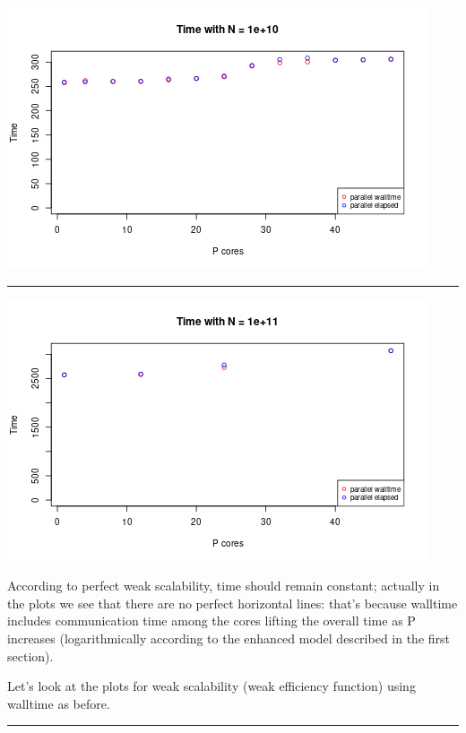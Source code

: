 \documentclass[
  10pt,
]{article}
\begin{document}
\begin{center}\includegraphics{figs/ws_time-3} \end{center}

\begin{center}\rule{0.5\linewidth}{0.5pt}\end{center}

\begin{center}\includegraphics{figs/ws_time-4} \end{center}

According to perfect weak scalability, time should remain constant;
actually in the plots we see that there are no perfect horizontal lines:
that's because walltime includes communication time among the cores
lifting the overall time as P increases (logarithmically according to
the enhanced model described in the first section).

Let's look at the plots for weak scalability (weak efficiency function)
using walltime as before.

\begin{center}\rule{0.5\linewidth}{0.5pt}\end{center}
\end{document}
